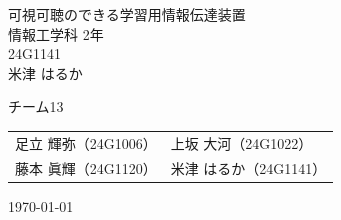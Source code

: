 \documentclass[uplatex,dvipdfmx]{jlreq}
\begin{document}
\begin{titlepage}
\vspace*{2cm}
\centering
\Huge\textsf{可視可聴のできる学習用情報伝達装置}\\[2cm]
\Large\textsf{情報工学科 2年}\\
\Large\textsf{24G1141}\\[5pt]
\huge\textsf{米津 はるか}

\vspace*{1cm}
\Large\sffamily
\begin{itembox}[c]{チーム13}
\centering
\begin{tabular}{ll}
足立 輝弥（24G1006）&
上坂 大河（24G1022）\\
藤本 眞輝（24G1120）&
米津 はるか（24G1141）\\
\end{tabular}
\end{itembox}

\vspace*{2cm}
\Large\textsf{\today}
\end{titlepage}
\clearpage








%
\end{document}
